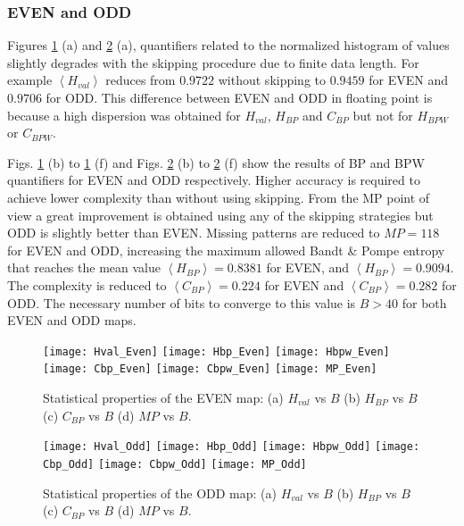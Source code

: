 \subsubsection{EVEN and ODD} \label{sssec:skipp}

Figures \ref{fig:EVEN_QuantiB} (a) and \ref{fig:ODD_QuantiB} (a), quantifiers related to the normalized histogram of values slightly degrades with the skipping procedure due to finite data length.
For example $\left\langle H_{val}\right\rangle $ reduces from $0.9722$ without skipping to $0.9459$ for EVEN and $0.9706$ for ODD. 
This difference between EVEN and ODD in floating point is because a high dispersion was obtained for $H_{val}$, $H_{BP}$ and $C_{BP}$ but not for $H_{BPW}$ or $C_{BPW}$.

Figs. \ref{fig:EVEN_QuantiB} (b) to \ref{fig:EVEN_QuantiB} (f) and Figs. \ref{fig:ODD_QuantiB} (b) to \ref{fig:ODD_QuantiB} (f) show the results of BP and BPW quantifiers for EVEN and ODD respectively.
Higher accuracy is required to achieve lower complexity than without using skipping.
From the MP point of view a great improvement is obtained using any of the skipping strategies but ODD is slightly better than EVEN.
Missing patterns are reduced to $MP = 118$ for EVEN and ODD, increasing the maximum allowed Bandt \& Pompe entropy that reaches the mean value $\left\langle H_{BP}\right\rangle  = 0.8381$ for EVEN, and $\left\langle H_{BP}\right\rangle  = 0.9094$.
The complexity is reduced to $\left\langle C_{BP}\right\rangle = 0.224$ for EVEN and $\left\langle C_{BP}\right\rangle = 0.282$ for ODD.
The necessary number of bits to converge to this value is $B>40$ for both EVEN and ODD maps.

\begin{figure}
	\texttt{[image: Hval\_Even]}
	\texttt{[image: Hbp\_Even]}
	\texttt{[image: Hbpw\_Even]}
	\texttt{[image: Cbp\_Even]}
	\texttt{[image: Cbpw\_Even]}
	\texttt{[image: MP\_Even]}
	\caption{Statistical properties of the EVEN map: (a) $H_{val}$ vs $B$ (b) $H_{BP}$ vs $B$ (c) $C_{BP}$ vs $B$ (d) $MP$ vs $B$.}
	\label{fig:EVEN_QuantiB}
\end{figure}

\begin{figure}
	\texttt{[image: Hval\_Odd]}
	\texttt{[image: Hbp\_Odd]}
	\texttt{[image: Hbpw\_Odd]}
	\texttt{[image: Cbp\_Odd]}
	\texttt{[image: Cbpw\_Odd]}
	\texttt{[image: MP\_Odd]}
	\caption{Statistical properties of the ODD map: (a) $H_{val}$ vs $B$ (b) $H_{BP}$ vs $B$ (c) $C_{BP}$ vs $B$ (d) $MP$ vs $B$.}
	\label{fig:ODD_QuantiB}
	\end{figure}

